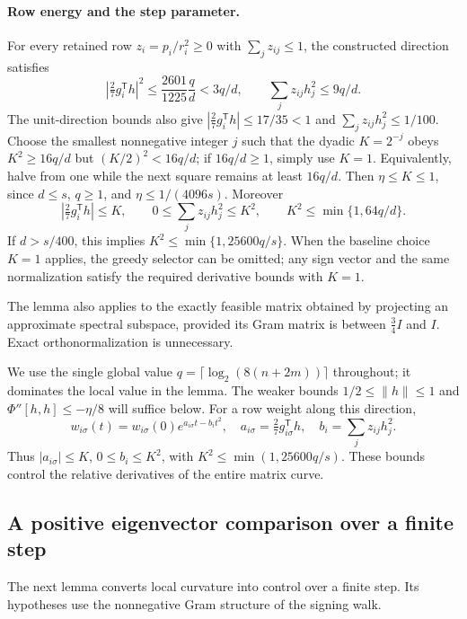 \documentclass[11pt]{amsart}
\theoremstyle{definition}\newtheorem{definition}[theorem]{Definition}
\theoremstyle{remark}\newtheorem{remark}[theorem]{Remark}
\numberwithin{equation}{section}
\newcommand{\T}{\mathsf T}
\begin{document}
\paragraph{Row energy and the step parameter.}
For every retained row $z_i=p_i/r_i^2\ge0$ with
$\sum_jz_{ij}\le1$, the constructed direction satisfies
\[
 \left|\tfrac27g_i^{\mathsf T}h\right|^2
       \le\frac{2601}{1225}\frac qd<3q/d,
 \qquad \sum_jz_{ij}h_j^2\le9q/d.
\]
The unit-direction bounds also give
$|\frac27g_i^{\mathsf T}h|\le17/35<1$ and
$\sum_jz_{ij}h_j^2\le1/100$.
Choose the smallest nonnegative integer $j$ such that the dyadic
$K=2^{-j}$ obeys $K^2\ge16q/d$ but $(K/2)^2<16q/d$;
if $16q/d\ge1$, simply use $K=1$.
Equivalently, halve from one while the next square remains at least
$16q/d$.  Then $\eta\le K\le1$, since $d\le s$, $q\ge1$, and $\eta\le1/(4096s)$. Moreover
\[
 |\tfrac27g_i^{\mathsf T}h|\le K,
 \qquad 0\le\sum_jz_{ij}h_j^2\le K^2,
 \qquad K^2\le\min\{1,64q/d\}.
\]
If $d>s/400$, this implies $K^2\le\min\{1,25600q/s\}$.
When the baseline choice $K=1$ applies, the greedy selector can be
omitted; any sign vector and the same normalization satisfy the
required derivative bounds with $K=1$.

The lemma also applies to the exactly feasible matrix obtained by
projecting an approximate spectral subspace, provided its Gram matrix is
between $\frac34I$ and $I$.  Exact orthonormalization is unnecessary.

We use the single global value $q=\lceil\log_2(8(n+2m))\rceil$ throughout;
it dominates the local value in the lemma. The weaker bounds
$1/2\le\|h\|\le1$ and $\Phi''[h,h]\le-\eta/8$ will suffice below.
For a row weight along this direction,
\[
 w_{i\sigma}(t)=w_{i\sigma}(0)e^{a_{i\sigma}t-b_it^2},\quad
 a_{i\sigma}=\tfrac27g_{i\sigma}^\T h,\quad
 b_i=\sum_jz_{ij}h_j^2.
\]
Thus $|a_{i\sigma}|\le K$, $0\le b_i\le K^2$, with
$K^2\le\min(1,25600q/s)$. These bounds control the relative derivatives of the entire matrix curve.


\subsection{A positive eigenvector comparison over a finite step}\label{b:sec:perron}
The next lemma converts local curvature into control over a finite step.
Its hypotheses use the nonnegative Gram structure of the signing walk.
\end{document}

